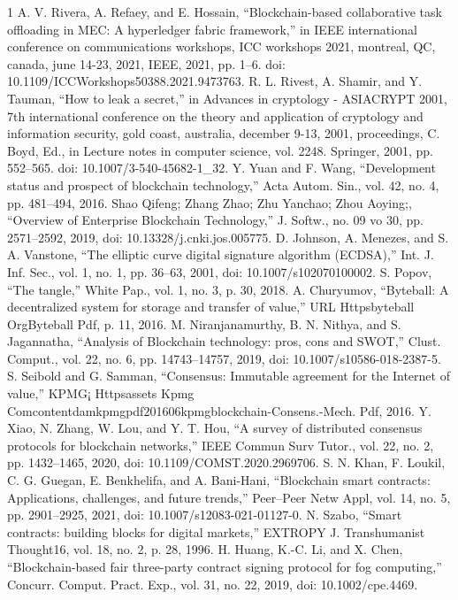 \documentclass[lettersize,journal]{IEEEtran}
\begin{document}
\begin{thebibliography}{1}
\bibitem{}A. V. Rivera, A. Refaey, and E. Hossain, “Blockchain-based collaborative task offloading in MEC: A hyperledger fabric framework,” in IEEE international conference on communications workshops, ICC workshops 2021, montreal, QC, canada, june 14-23, 2021, IEEE, 2021, pp. 1–6. doi: 10.1109/ICCWorkshops50388.2021.9473763.
\bibitem{}R. L. Rivest, A. Shamir, and Y. Tauman, “How to leak a secret,” in Advances in cryptology - ASIACRYPT 2001, 7th international conference on the theory and application of cryptology and information security, gold coast, australia, december 9-13, 2001, proceedings, C. Boyd, Ed., in Lecture notes in computer science, vol. 2248. Springer, 2001, pp. 552–565. doi: 10.1007/3-540-45682-1\_32.
\bibitem{}Y. Yuan and F. Wang, “Development status and prospect of blockchain technology,” Acta Autom. Sin., vol. 42, no. 4, pp. 481–494, 2016.
\bibitem{}Shao Qifeng; Zhang Zhao; Zhu Yanchao; Zhou Aoying;, “Overview of Enterprise Blockchain Technology,” J. Softw., no. 09 vo 30, pp. 2571–2592, 2019, doi: 10.13328/j.cnki.jos.005775.
\bibitem{}D. Johnson, A. Menezes, and S. A. Vanstone, “The elliptic curve digital signature algorithm (ECDSA),” Int. J. Inf. Sec., vol. 1, no. 1, pp. 36–63, 2001, doi: 10.1007/s102070100002.
\bibitem{}S. Popov, “The tangle,” White Pap., vol. 1, no. 3, p. 30, 2018.
\bibitem{}A. Churyumov, “Byteball: A decentralized system for storage and transfer of value,” URL Httpsbyteball OrgByteball Pdf, p. 11, 2016.
\bibitem{}M. Niranjanamurthy, B. N. Nithya, and S. Jagannatha, “Analysis of Blockchain technology: pros, cons and SWOT,” Clust. Comput., vol. 22, no. 6, pp. 14743–14757, 2019, doi: 10.1007/s10586-018-2387-5.
\bibitem{}S. Seibold and G. Samman, “Consensus: Immutable agreement for the Internet of value,” KPMG¡ Httpsassets Kpmg Comcontentdamkpmgpdf201606kpmgblockchain-Consens.-Mech. Pdf, 2016.
\bibitem{}Y. Xiao, N. Zhang, W. Lou, and Y. T. Hou, “A survey of distributed consensus protocols for blockchain networks,” IEEE Commun Surv Tutor., vol. 22, no. 2, pp. 1432–1465, 2020, doi: 10.1109/COMST.2020.2969706.
\bibitem{}S. N. Khan, F. Loukil, C. G. Guegan, E. Benkhelifa, and A. Bani-Hani, “Blockchain smart contracts: Applications, challenges, and future trends,” Peer--Peer Netw Appl, vol. 14, no. 5, pp. 2901–2925, 2021, doi: 10.1007/s12083-021-01127-0.
\bibitem{}N. Szabo, “Smart contracts: building blocks for digital markets,” EXTROPY J. Transhumanist Thought16, vol. 18, no. 2, p. 28, 1996.
\bibitem{}H. Huang, K.-C. Li, and X. Chen, “Blockchain-based fair three-party contract signing protocol for fog computing,” Concurr. Comput. Pract. Exp., vol. 31, no. 22, 2019, doi: 10.1002/cpe.4469.

\end{thebibliography}
\end{document}
